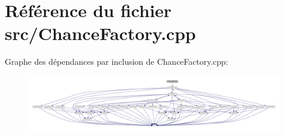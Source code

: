 \section{Référence du fichier src/\-Chance\-Factory.cpp}
\label{_chance_factory_8cpp}
Graphe des dépendances par inclusion de Chance\-Factory.\-cpp\-:\nopagebreak
\begin{figure}[H]
\begin{center}
\leavevmode
\includegraphics[width=350pt]{_chance_factory_8cpp__incl}
\end{center}
\end{figure}
